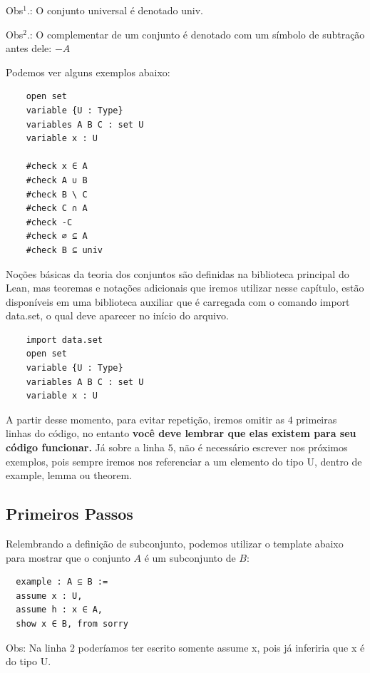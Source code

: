   Obs$^{1}$.: O conjunto universal é denotado { \selectfont univ}.

  Obs$^{2}$.: O complementar de um conjunto é denotado com um símbolo de subtração antes dele: $-A$

  Podemos ver alguns exemplos abaixo:
  \begin{lstlisting}
    open set
    variable {U : Type}
    variables A B C : set U
    variable x : U

    #check x ∈ A
    #check A ∪ B
    #check B \ C
    #check C ∩ A
    #check -C
    #check ∅ ⊆ A
    #check B ⊆ univ \end{lstlisting}

  Noções básicas da teoria dos conjuntos são definidas na biblioteca principal do Lean, mas teoremas e notações adicionais que iremos utilizar nesse capítulo, estão disponíveis em uma biblioteca auxiliar que é carregada com o comando
  { \selectfont import data.set}, o qual deve aparecer no início do arquivo.

  \begin{lstlisting}
    import data.set
    open set
    variable {U : Type}
    variables A B C : set U
    variable x : U \end{lstlisting}

  A partir desse momento, para evitar repetição, iremos omitir as $4$ primeiras linhas do código, no entanto \textbf{você deve lembrar que elas existem para seu código funcionar.} Já sobre a linha $5$, não é necessário escrever nos próximos exemplos, pois sempre iremos nos referenciar a um elemento do tipo{ \selectfont U}, dentro de {\selectfont example, lemma} ou {\selectfont theorem}.

  \subsection{Primeiros Passos}

  Relembrando a definição de subconjunto, podemos utilizar o template abaixo para mostrar que o conjunto $A$ é um subconjunto de $B$:

  \begin{lstlisting}
  example : A ⊆ B :=
  assume x : U,
  assume h : x ∈ A,
  show x ∈ B, from sorry \end{lstlisting}

  Obs: Na linha $2$ poderíamos ter escrito somente {\selectfont assume x}, pois já inferiria que {\selectfont x} é do tipo {\selectfont U}.

